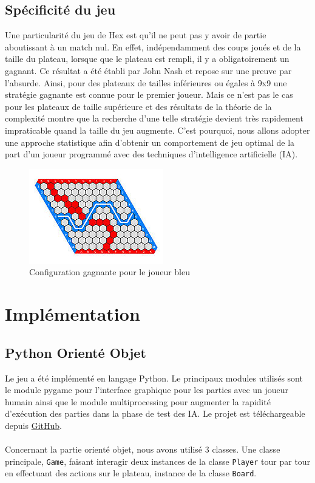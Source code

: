 \documentclass[a4paper]{article}
\theoremstyle{definition}
\begin{document}
\subsection{Spécificité du jeu}

Une particularité du jeu de Hex est qu'il ne peut pas y avoir de partie aboutissant à un match nul. En effet, indépendamment des coups joués et de la taille du plateau, lorsque que le plateau est rempli, il y a obligatoirement un gagnant. Ce résultat a été établi par John Nash et repose sur une preuve par l'absurde.
Ainsi, pour des plateaux de tailles inférieures ou égales à 9x9 une stratégie gagnante est connue pour le premier joueur. Mais ce n'est pas le cas pour les plateaux de taille supérieure et des résultats de la théorie de la complexité montre que la recherche d'une telle stratégie devient très rapidement impraticable quand la taille du jeu augmente. C'est pourquoi, nous allons adopter une approche statistique afin d'obtenir un comportement de jeu optimal de la part d'un joueur programmé avec des techniques d'intelligence artificielle (IA).

\begin{figure}[h]
	\centering
	\includegraphics[scale=1]{11x11_gagnant.jpg}
	\caption{Configuration gagnante pour le joueur bleu}
\end{figure}

\section{Implémentation}

\subsection{Python Orienté Objet}

Le jeu a été implémenté en langage Python. Le principaux modules utilisés sont le module pygame pour l'interface graphique pour les parties avec un joueur humain ainsi que le module multiprocessing pour augmenter la rapidité d'exécution des parties dans la phase de test des IA. Le projet est téléchargeable depuis \href{https://github.com/Maxime-LP/Hex-Game}{GitHub}.\\
\\
Concernant la partie orienté objet, nous avons utilisé 3 classes. Une classe principale, \texttt{Game}, faisant interagir deux instances de la classe \texttt{Player} tour par tour en effectuant des actions sur le plateau, instance de la classe \texttt{Board}.
\end{document}
